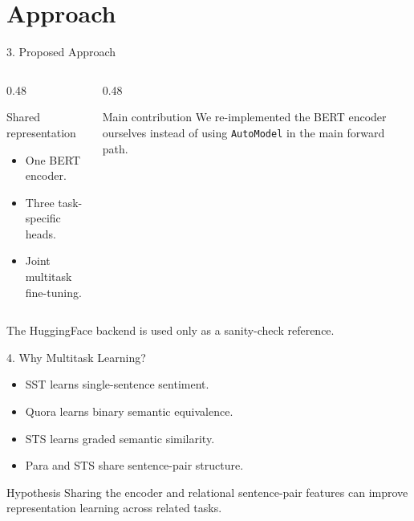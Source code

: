 \documentclass[t, aspectratio=169]{beamer}
\begin{document}
\section{Approach}

\begin{frame}{3. Proposed Approach}
    \begin{columns}[T]
        \begin{column}{0.48\textwidth}
            \begin{block}{Shared representation}
                \begin{itemize}
                    \item One BERT encoder.
                    \item Three task-specific heads.
                    \item Joint multitask fine-tuning.
                \end{itemize}
            \end{block}
        \end{column}
        \begin{column}{0.48\textwidth}
            \begin{alertblock}{Main contribution}
                We re-implemented the BERT encoder ourselves instead of using \texttt{AutoModel} in the main forward path.
            \end{alertblock}
        \end{column}
    \end{columns}

    \vspace{0.6em}
    The HuggingFace backend is used only as a sanity-check reference.
\end{frame}

\begin{frame}{4. Why Multitask Learning?}
    \begin{itemize}
        \item SST learns single-sentence sentiment.
        \item Quora learns binary semantic equivalence.
        \item STS learns graded semantic similarity.
        \item Para and STS share sentence-pair structure.
    \end{itemize}

    \vspace{0.8em}
    \begin{block}{Hypothesis}
        Sharing the encoder and relational sentence-pair features can improve representation learning across related tasks.
    \end{block}
\end{frame}
\end{document}
